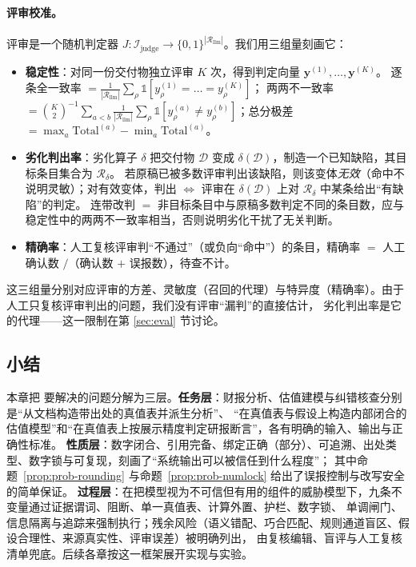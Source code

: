 \paragraph{评审校准。}
评审是一个随机判定器 $J:\mathcal{I}_{\text{judge}}\to\{0,1\}^{|\mathcal{R}_{\text{llm}}|}$。我们用三组量刻画它：
\begin{itemize}
\item \textbf{稳定性}：对同一份交付物独立评审 $K$ 次，得到判定向量 $\mathbf{y}^{(1)},\dots,\mathbf{y}^{(K)}$。
      逐条全一致率 $=\frac{1}{|\mathcal{R}_{\text{llm}}|}\sum_\rho\mathbb{1}[y^{(1)}_\rho=\dots=y^{(K)}_\rho]$；
      两两不一致率 $=\binom{K}{2}^{-1}\sum_{a<b}\frac{1}{|\mathcal{R}_{\text{llm}}|}\sum_\rho\mathbb{1}[y^{(a)}_\rho\neq y^{(b)}_\rho]$；总分极差 $=\max_a\text{Total}^{(a)}-\min_a\text{Total}^{(a)}$。
\item \textbf{劣化判出率}：劣化算子 $\delta$ 把交付物 $\mathcal{D}$ 变成 $\delta(\mathcal{D})$，制造一个已知缺陷，其目标条目集合为 $\mathcal{R}_\delta$。
      若原稿已被多数评审判出该缺陷，则该变体\emph{无效}（命中不说明灵敏）；对有效变体，判出 $\iff$ 评审在 $\delta(\mathcal{D})$ 上对 $\mathcal{R}_\delta$ 中某条给出“有缺陷”的判定。
      连带改判 $=$ 非目标条目中与原稿多数判定不同的条目数，应与稳定性中的两两不一致率相当，否则说明劣化干扰了无关判断。
\item \textbf{精确率}：人工复核评审判“不通过”（或负向“命中”）的条目，精确率 $=$ 人工确认数 $/$（确认数 $+$ 误报数），待查不计。
\end{itemize}
这三组量分别对应评审的方差、灵敏度（召回的代理）与特异度（精确率）。由于人工只复核评审判出的问题，我们没有评审“漏判”的直接估计，
劣化判出率是它的代理——这一限制在第 \ref{sec:eval} 节讨论。

\subsection{小结}
\label{sec:prob-summary}

本章把 \sysname{} 要解决的问题分解为三层。\textbf{任务层}：财报分析、估值建模与纠错核查分别是“从文档构造带出处的真值表并派生分析”、
“在真值表与假设上构造内部闭合的估值模型”和“在真值表上按展示精度判定研报断言”，各有明确的输入、输出与正确性标准。
\textbf{性质层}：数字闭合、引用完备、绑定正确（部分）、可追溯、出处类型、数字锁与可复现，刻画了“系统输出可以被信任到什么程度”；
其中命题~\ref{prop:prob-rounding} 与命题~\ref{prop:prob-numlock} 给出了误报控制与改写安全的简单保证。
\textbf{过程层}：在把模型视为不可信但有用的组件的威胁模型下，九条不变量通过证据谓词、阻断、单一真值表、计算外置、护栏、数字锁、
单调闸门、信息隔离与追踪来强制执行；残余风险（语义错配、巧合匹配、规则通道盲区、假设合理性、来源真实性、评审误差）被明确列出，
由复核编辑、盲评与人工复核清单兜底。后续各章按这一框架展开实现与实验。
